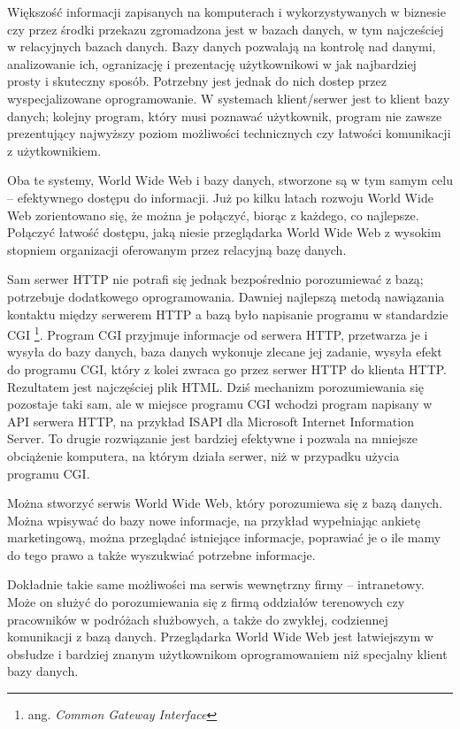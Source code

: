 Większość informacji zapisanych na komputerach i wykorzystywanych w biznesie czy przez środki przekazu zgromadzona jest w 
bazach danych, w tym najcześciej w relacyjnych bazach danych. Bazy danych pozwalają na kontrolę nad danymi, analizowanie ich, 
ogranizację i prezentację użytkownikowi w jak najbardziej prosty i skuteczny sposób. Potrzebny jest jednak do nich dostep 
przez wyspecjalizowane oprogramowanie. W systemach klient/serwer jest to klient bazy danych; kolejny program, który musi 
poznawać użytkownik, program nie zawsze prezentujący najwyższy poziom możliwości technicznych czy łatwości komunikacji z 
użytkownikiem.

Oba te systemy, World Wide Web i bazy danych, stworzone są w tym samym celu -- efektywnego dostępu do informacji. Już po kilku 
latach rozwoju World Wide Web zorientowano się, że można je połączyć, biorąc z każdego, co najlepsze. Połączyć łatwość dostępu,
jaką niesie przeglądarka World Wide Web z wysokim stopniem organizacji oferowanym przez relacyjną bazę danych.

Sam serwer HTTP nie potrafi się jednak bezpośrednio porozumiewać z bazą; potrzebuje dodatkowego oprogramowania. Dawniej 
najlepszą metodą nawiązania kontaktu między serwerem HTTP a bazą było napisanie programu w standardzie CGI 
\footnote{ang. \emph{Common Gateway Interface}}. Program CGI przyjmuje informacje od serwera HTTP, przetwarza je i 
wysyła do bazy danych, baza 
danych wykonuje zlecane jej zadanie, wysyła efekt do programu CGI, który z kolei zwraca go przez serwer HTTP do klienta HTTP. 
Rezultatem jest najczęściej plik HTML. Dziś mechanizm porozumiewania się pozostaje taki sam, ale w miejsce programu CGI 
wchodzi program napisany w API serwera HTTP, na przykład ISAPI dla Microsoft Internet Information Server. To drugie 
rozwiązanie jest bardziej efektywne i pozwala na mniejsze obciążenie komputera, na którym działa serwer, niż w przypadku 
użycia programu CGI.

Można stworzyć serwis World Wide Web, który porozumiewa się z bazą danych. Można wpisywać do bazy nowe informacje, na przykład 
wypełniając ankietę marketingową, można przeglądać istniejące informacje, poprawiać je o ile mamy do tego prawo a także 
wyszukwiać potrzebne informacje.

Dokładnie takie same możliwości ma serwis wewnętrzny firmy -- intranetowy. Może on służyć do porozumiewania się z firmą 
oddziałów terenowych czy pracowników w podróżach służbowych, a także do zwykłej, codziennej komunikacji z bazą danych. 
Przeglądarka World Wide Web jest łatwiejszym w obsłudze i bardziej znanym użytkownikom oprogramowaniem niż specjalny klient 
bazy danych.

